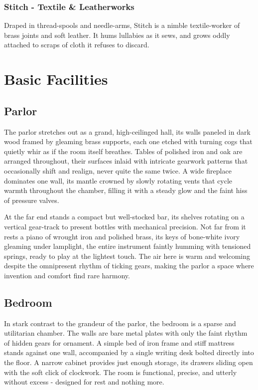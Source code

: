 \subsubsection*{Stitch - Textile \& Leatherworks}
{\entryfont Draped in thread-spools and needle-arms, Stitch is a nimble textile-worker of brass joints and soft leather. It hums lullabies as it sews, and grows oddly attached to scraps of cloth it refuses to discard.}
\vfill\eject
\section*{Basic Facilities}
\subsection*{ Parlor}
{\entryfont The parlor stretches out as a grand, high-ceilinged hall, its walls paneled in dark wood framed by gleaming brass supports, each one etched with turning cogs that quietly whir as if the room itself breathes. Tables of polished iron and oak are arranged throughout, their surfaces inlaid with intricate gearwork patterns that occasionally shift and realign, never quite the same twice. A wide fireplace dominates one wall, its mantle crowned by slowly rotating vents that cycle warmth throughout the chamber, filling it with a steady glow and the faint hiss of pressure valves.}

{\entryfont At the far end stands a compact but well-stocked bar, its shelves rotating on a vertical gear-track to present bottles with mechanical precision. Not far from it rests a piano of wrought iron and polished brass, its keys of bone-white ivory gleaming under lamplight, the entire instrument faintly humming with tensioned springs, ready to play at the lightest touch. The air here is warm and welcoming despite the omnipresent rhythm of ticking gears, making the parlor a space where invention and comfort find rare harmony.}
\subsection*{ Bedroom}
{\entryfont In stark contrast to the grandeur of the parlor, the bedroom is a sparse and utilitarian chamber. The walls are bare metal plates with only the faint rhythm of hidden gears for ornament. A simple bed of iron frame and stiff mattress stands against one wall, accompanied by a single writing desk bolted directly into the floor. A narrow cabinet provides just enough storage, its drawers sliding open with the soft click of clockwork. The room is functional, precise, and utterly without excess - designed for rest and nothing more.}

